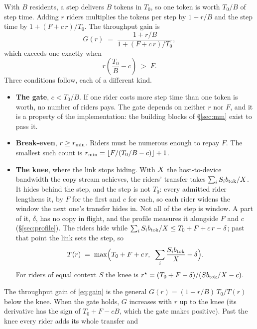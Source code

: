 With $B$ residents, a step delivers $B$ tokens in $T_0$, so one token is worth
$T_0/B$ of step time. Adding $r$ riders multiplies the tokens per step by
$1+r/B$ and the step time by $1+(F+c\,r)/T_0$. The throughput gain is
\begin{equation}
  G(r) \;=\; \frac{1 + r/B}{1 + (F + c\,r)/T_0},
  \label{eq:gain}
\end{equation}
which exceeds one exactly when
\begin{equation}
  r\left(\frac{T_0}{B}-c\right) \;>\; F .
  \label{eq:pays}
\end{equation}
Three conditions follow, each of a different kind.
\begin{itemize}\itemsep1pt
\item \textbf{The gate}, $c < T_0/B$. If one rider costs more step time than
  one token is worth, no number of riders pays. The gate depends on neither $r$
  nor $F$, and it is a property of the implementation: the building blocks of
  \S\ref{sec:mm} exist to pass it.
\item \textbf{Break-even}, $r \ge r_{\min}$. Riders must be numerous enough to
  repay $F$. The smallest such count is
  $r_{\min} = \lfloor F/(T_0/B - c)\rfloor + 1$.
\item \textbf{The knee}, where the link stops hiding. With $X$ the
  host-to-device bandwidth the copy stream achieves, the riders' transfer
  takes $\sum_i S_ib_{\mathrm{tok}}/X$. It hides behind the step, and the step is
  not $T_0$: every admitted rider lengthens it, by $F$ for the first and $c$
  for each, so each rider widens the window the next one's transfer hides in.
  Not all of the step is window. A part of it, $\delta$, has no copy in
  flight, and the profile measures it alongside $F$ and $c$
  (\S\ref{sec:profile}). The riders hide while
  $\sum_i S_ib_{\mathrm{tok}}/X \le T_0 + F + c\,r - \delta$; past that point the
  link sets the step, so
  \begin{equation}
    T(r) \;=\; \max\Bigl(T_0 + F + c\,r,\;\; \sum_i \frac{S_ib_{\mathrm{tok}}}{X} + \delta\Bigr).
    \label{eq:step}
  \end{equation}
  For riders of equal context $S$ the knee is
  $r^{\star} = (T_0 + F - \delta)/(Sb_{\mathrm{tok}}/X - c)$.
\end{itemize}
The throughput gain of \cref{eq:gain} is the general
$G(r) = (1+r/B)\,T_0/T(r)$ below the knee. When the gate holds, $G$ increases
with $r$ up to the knee (its derivative has the sign of $T_0 + F - cB$, which
the gate makes positive). Past the knee every rider adds its whole transfer and
